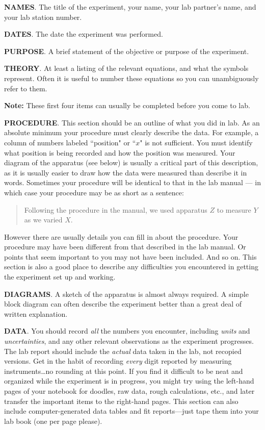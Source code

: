 \begin{description}
\item {\bf NAMES}.  The title of the experiment, your name, your
lab partner's name, and your lab station number.

\item {\bf DATES}.  The date the experiment was performed.

\item {\bf PURPOSE}.  A brief statement of the objective or purpose of the
experiment.

\item {\bf THEORY}.  At least a listing of the relevant equations, and what the symbols
represent.  Often it is useful to number these equations so you can
unambiguously refer to them.

{\bf Note:}  These first four items can usually be completed before
you come to lab.  

\item {\bf PROCEDURE}.  This section should be an outline of
what you did in lab.  
As an absolute minimum your procedure must clearly describe
the data.  For example, a column of numbers labeled ``position" or ``$x$"
is not sufficient.  You must identify what position is being recorded
and how the position was measured.  Your diagram of the
apparatus (see below) is usually a critical part of this
description, as it is usually easier to draw how the data
were measured than describe it in words.  Sometimes
your procedure will be identical to that
in the lab manual --- in which case your procedure may be 
as short as a sentence:
\begin{quote}
Following the procedure in the manual, we used apparatus $Z$
to measure $Y$ as we varied $X$.
\end{quote}
However there are usually
details you can fill in about the procedure.  Your procedure
may have been different from that described in the lab manual.
Or points that seem important to you may not have been included.
And so on.  This section is also a good place to describe any
difficulties you encountered in getting the experiment set up and
working.

\item {\bf DIAGRAMS}.  A sketch of the
apparatus is almost always required.  A simple block diagram can often describe the
experiment better than a great deal of written explanation.

\item {\bf DATA}.  You should record {\em all} the numbers
you encounter,
including {\em units} and {\em uncertainties}, and any other relevant
observations  as the experiment progresses.  The lab
report should include the {\em actual} data taken in the lab, not
recopied versions.  Get in the habit of recording {\em every} digit
reported by measuring instruments\ldots no rounding at this point.
If you find it difficult to be neat and organized while
the experiment is in progress, you might try using the left-hand pages of
your notebook for doodles, raw data, rough calculations, etc., and later
transfer the important items to the right-hand pages.
This section can also include computer-generated data tables and
fit reports---just tape them into your lab book (one per page please).


\end{description}
